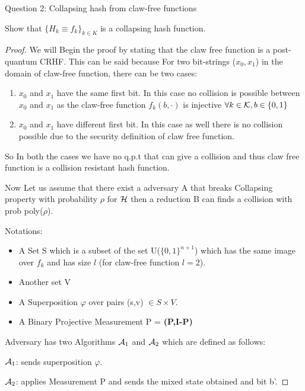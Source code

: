 \begin{solution}{Question 2: Collapsing hash from claw-free functions}\label{ques:x}
    \begin{question}
    Show that $\{H_k \equiv f_k\}_{k\in K}$ is a collapsing hash function.
    \end{question}
    \tcblower{}
    \begin{proof}
    We will Begin the proof by stating that the claw free function is a post-quantum CRHF. This can be said because For two bit-strings ($x_0,x_1$) in the domain of claw-free function, there can be two cases: \begin{enumerate}
        \item $x_0$ and $x_1$ have the same first bit. In this case no collision is possible between $x_0$ and $x_1$ as the claw-free function $f_k(b,\cdot)$ is injective $\forall k \in \mathcal{K}, b \in \{0,1\}$
        \item $x_0$ and $x_1$ have different first bit. In this case as well there is no collision possible due to the security definition of claw free function.
    \end{enumerate}

    So In both the cases we have no q.p.t that can give a collision and thus claw free function is a collision resistant hash function.

    Now Let us assume that there exist a adversary A that breaks Collapsing property with probability $\rho$ for $\mathcal{H}$ then a reduction B can finds a collision with prob poly($\rho$).

    Notations:
    \begin{itemize}
        \item A Set S which is a subset of the set U($\{0,1\}^{n+1}$) which has the same image over $f_k$ and has size $l$ (for claw-free function $l=2$).
        \item Another set V
        \item A Superposition $\varphi$ over pairs (s,v) $\in S \times V$.
        \item A Binary Projective Measurement P = \textbf{(P,I-P)}
    \end{itemize}

    Adversary has two Algorithms $\mathcal{A}_1$ and $\mathcal{A}_2$ which are defined as follows:

    $\mathcal{A}_1$: sends superposition $\varphi$.

    $\mathcal{A}_2$: applies Measurement P and sends the mixed state obtained and bit b'.\newline


\end{proof}
\end{solution}
